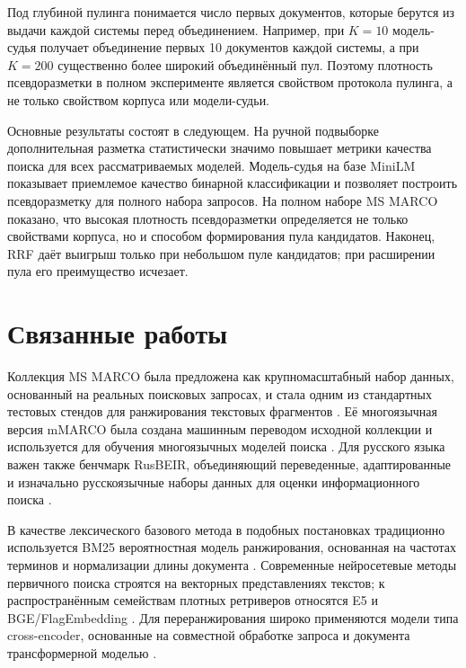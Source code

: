 \documentclass[runningheads,a4paper]{llncs}
\begin{document}
Под глубиной пулинга понимается число первых документов, которые берутся из выдачи каждой системы перед объединением. Например, при $K=10$ модель-судья получает объединение первых 10 документов каждой системы, а при $K=200$ \textemdash{} существенно более широкий объединённый пул. Поэтому плотность псевдоразметки в полном эксперименте является свойством протокола пулинга, а не только свойством корпуса или модели-судьи.

Основные результаты состоят в следующем. На ручной подвыборке дополнительная разметка статистически значимо повышает метрики качества поиска для всех рассматриваемых моделей. Модель-судья на базе MiniLM \cite{wang2020minilm,reimers2019sentencebert} показывает приемлемое качество бинарной классификации и позволяет построить псевдоразметку для полного набора запросов. На полном наборе MS MARCO показано, что высокая плотность псевдоразметки определяется не только свойствами корпуса, но и способом формирования пула кандидатов. Наконец, RRF даёт выигрыш только при небольшом пуле кандидатов; при расширении пула его преимущество исчезает.

\section{Связанные работы}

Коллекция MS MARCO была предложена как крупномасштабный набор данных, основанный на реальных поисковых запросах, и стала одним из стандартных тестовых стендов для ранжирования текстовых фрагментов \cite{bajaj2016msmarco}. Её многоязычная версия mMARCO была создана машинным переводом исходной коллекции и используется для обучения многоязычных моделей поиска \cite{bonifacio2022mmarco}. Для русского языка важен также бенчмарк RusBEIR, объединяющий переведенные, адаптированные и изначально русскоязычные наборы данных для оценки информационного поиска \cite{2025rusbeir}.

В качестве лексического базового метода в подобных постановках традиционно используется BM25 \textemdash{} вероятностная модель ранжирования, основанная на частотах терминов и нормализации длины документа \cite{robertson2009bm25}. Современные нейросетевые методы первичного поиска строятся на векторных представлениях текстов; к распространённым семействам плотных ретриверов относятся E5 \cite{wang2022e5} и BGE/FlagEmbedding \cite{xiao2023cpack}. Для переранжирования широко применяются модели типа cross-encoder, основанные на совместной обработке запроса и документа трансформерной моделью \cite{nogueira2019bert}.
\end{document}
